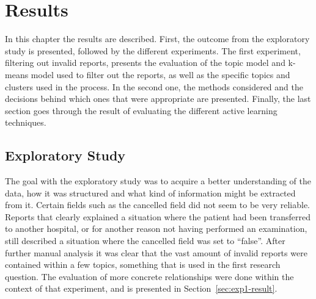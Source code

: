 \chapter{Results}
\label{cha:results}




In this chapter the results are described.
First, the outcome from the exploratory study is presented, followed by the different experiments.
The first experiment, filtering out invalid reports, presents the evaluation of the topic model and k-means model used to filter out the reports, as well as the specific topics and clusters used in the process.
In the second one, the methods considered and the decisions behind which ones that were appropriate are presented.
Finally, the last section goes through the result of evaluating the different active learning techniques.

\section{Exploratory Study}

The goal with the exploratory study was to acquire a better understanding of the data, how it was structured and what kind of information might be extracted from it.
Certain fields such as the cancelled field did not seem to be very reliable. 
Reports that clearly explained a situation where the patient had been transferred to another hospital, or for another reason not having performed an examination, still described a situation where the cancelled field was set to ``false''.
After further manual analysis it was clear that the vast amount of invalid reports were contained within a few topics, something that is used in the first research question.
The evaluation of more concrete relationships were done within the context of that experiment, and is presented in Section~\ref{sec:exp1-result}.

